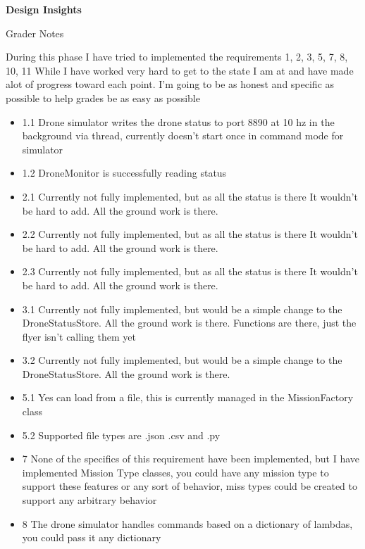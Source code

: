 \documentclass[12pt]{article}
\begin{document}
\begingroup
      \fontsize{14pt}{12pt}\selectfont

      \centerline{\textbf{Design Insights}} \par
\endgroup

Grader Notes

During this phase I have tried to implemented the requirements 1, 2, 3, 5, 7, 8, 10, 11
While I have worked very hard to get to the state I am at and have made alot of progress toward each point.
I'm going to be as honest and specific as possible to help grades be as easy as possible

\begin{itemize}
    \item 1.1 Drone simulator writes the drone status to port 8890 at 10 hz in the background via thread, currently doesn't start once in command mode for simulator
    \item 1.2 DroneMonitor is successfully reading status 
    \item 2.1 Currently not fully implemented, but as all the status is there It wouldn't be hard to add. All the ground work is there.
    \item 2.2 Currently not fully implemented, but as all the status is there It wouldn't be hard to add. All the ground work is there.
    \item 2.3 Currently not fully implemented, but as all the status is there It wouldn't be hard to add. All the ground work is there.
    \item 3.1 Currently not fully implemented, but would be a simple change to the DroneStatusStore. All the ground work is there. Functions are there, just the flyer isn't calling them yet
    \item 3.2 Currently not fully implemented, but would be a simple change to the DroneStatusStore. All the ground work is there.
    \item 5.1 Yes can load from a file, this is currently managed in the MissionFactory class
    \item 5.2 Supported file types are .json .csv and .py
    \item 7 None of the specifics of this requirement have been implemented, but I have implemented Mission Type classes, you could have any mission type to support these features or any sort of behavior, 
     miss  types could be created to support any arbitrary behavior
    \item 8 The drone simulator handles commands based on a dictionary of lambdas, you could pass it any dictionary

\end{itemize}
\end{document}
